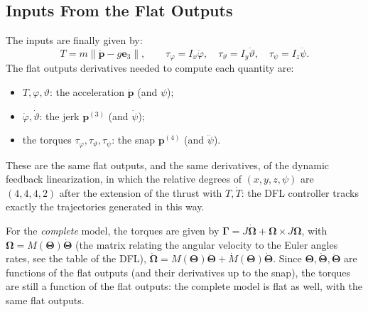 \documentclass[10pt, a4paper]{report}
\begin{document}
\subsection{Inputs From the Flat Outputs}
The inputs are finally given by:\begin{equation}
    T=m\|\ddot{\mathbf p}-g\mathbf e_3\|,\quad\quad\tau_\varphi=I_x\ddot\varphi,\quad\tau_\vartheta=I_y\ddot\vartheta,\quad\tau_\psi=I_z\ddot\psi.
\end{equation}
The flat outputs derivatives needed to compute each quantity are:\begin{itemize}
    \item $T,\varphi,\vartheta$: the acceleration $\ddot{\mathbf p}$ (and $\psi$);
    \item $\dot\varphi,\dot\vartheta$: the jerk $\mathbf p^{(3)}$ (and $\dot\psi$);
    \item the torques $\tau_\varphi,\tau_\vartheta,\tau_\psi$: the snap $\mathbf p^{(4)}$ (and $\ddot\psi$).
\end{itemize}
These are the same flat outputs, and the same derivatives, of the dynamic feedback linearization, in which the relative degrees of $(x,y,z,\psi)$ are $(4,4,4,2)$ after the extension of the thrust with $T,\dot T$: the DFL controller tracks exactly the trajectories generated in this way.
\begin{boxobservation}{}{}
    For the \textit{complete} model, the torques are given by $\boldsymbol{\Gamma}=J\dot{\boldsymbol{\Omega}}+\boldsymbol{\Omega}\times J\boldsymbol{\Omega}$, with $\boldsymbol{\Omega}=M(\boldsymbol{\Theta})\dot{\boldsymbol{\Theta}}$ (the matrix relating the angular velocity to the Euler angles rates, see the table of the DFL), $\dot{\boldsymbol{\Omega}}=M(\boldsymbol{\Theta})\ddot{\boldsymbol{\Theta}}+\dot M(\boldsymbol{\Theta})\dot{\boldsymbol{\Theta}}$. Since $\boldsymbol{\Theta},\dot{\boldsymbol{\Theta}},\ddot{\boldsymbol{\Theta}}$ are functions of the flat outputs (and their derivatives up to the snap), the torques are still a function of the flat outputs: the complete model is flat as well, with the same flat outputs.
\end{boxobservation}
\end{document}
